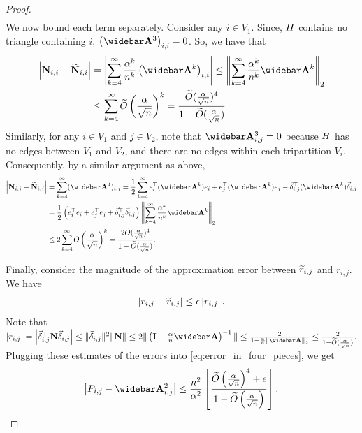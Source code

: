 \begin{proof}
\begin{align}
\end{align}
We now bound each term separately. Consider any $i \in V_1$. Since, $H$ contains no triangle containing $i$, $\left(\Abar^3\right)_{i,i} = 0$. So, we have that 
\begin{align*}
    \left\lvert \N_{i,i} - \Ntilde_{i,i}\right\rvert &= \left\lvert \sum_{k=4}^\infty \frac{\alpha^k}{n^k} \left(\Abar^k\right)_{i,i}\right\rvert \leq \Norm{ \sum_{k=4}^\infty \frac{\alpha^k}{n^k} \Abar^k }_2 \\
    &\leq \sum_{k=4}^\infty \widetilde{O}\pars{\frac{\alpha}{\sqrt{n}}}^k = \frac{\Otilde{\frac{\alpha}{\sqrt{n}}}^4}{1 - \Otilde{\frac{\alpha}{\sqrt{n}}}}
\end{align*}
Similarly, for any $i \in V_1$ and $j \in V_2$, note that $\Abar^3_{i,j} = 0$ because $H$ has no edges between $V_1$ and $V_2$, and there are no edges within each tripartition $V_i$. Consequently, by a similar argument as above, 
\begin{align*}
    \left\lvert \N_{i,j} - \Ntilde_{i,j}\right\rvert &= \sum_{k=4}^\infty (\Abar^4)_{i,j} = \frac{1}{2}\sum_{k=4}^\infty e_i^\top (\Abar^k) e_i  +  e_j^\top (\Abar^k) e_j  - \vec{\delta}_{i,j}^\top (\Abar^k) \vec{\delta}_{i,j} \\
    &= \frac{1}{2} \left( e_i^\top e_i + e_j^\top e_j + \vec{\delta}_{i,j}^\top \vec{\delta}_{i,j}\right) \Norm{ \sum_{k=4}^\infty \frac{\alpha^k}{n^k} \Abar^k }_2 \\
    &\leq 2 \sum_{k=4}^\infty \widetilde{O}\pars{\frac{\alpha}{\sqrt{n}}}^k = \frac{2 \Otilde{\frac{\alpha}{\sqrt{n}}}^4}{1 - \Otilde{\frac{\alpha}{\sqrt{n}}}}. 
\end{align*} 

Finally, consider the magnitude of the approximation error between $\widetilde{r}_{i,j}$ and $r_{i,j}$. We have
\begin{align*}
    \left| r_{i,j} - \widetilde{r}_{i,j} \right| \leq \epsilon \left| r_{i,j} \right|.
\end{align*}
Note that $\abs{r_{i,j}} = \abs{\deltaij^\top \N \deltaij} \leq \norm{\deltaij}^2 \norm{\N} \leq 2 \norm{\pars{\I - \frac{\alpha}{n}\As}^{-1}} \leq \frac{2}{1-\frac{\alpha}{n} \Norm{\Abar}_2 } \leq \frac{2}{1 - \Otilde{\frac{\alpha}{\sqrt{n}}}}. $
Plugging these estimates of the errors into \eqref{eq:error_in_four_pieces}, we get
\begin{align*}
    \abs{P_{i,j} - \As^2_{i,j}} \leq \frac{n^2}{\alpha^2} \sqrs{\frac{\widetilde{O}\pars{\frac{\alpha}{\sqrt{n}}}^4 + \epsilon}{1 - \widetilde{O}\pars{\frac{\alpha}{\sqrt{n}}}}}.
\end{align*}


\end{proof}
